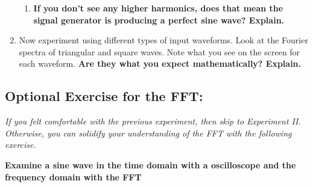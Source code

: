 \documentclass{../lab}
\begin{document}
\begin{enumerate}
\begin{enumerate}
        \item \textbf{If you don't see any higher harmonics, does that mean the signal generator is producing a perfect sine wave? Explain.}

    \end{enumerate}

    \item Now experiment using different types of input waveforms. Look at the Fourier spectra of triangular and square waves. Note what you see on the screen for each waveform. \textbf{Are they what you expect mathematically? Explain.}

\end{enumerate}

\subsection{Optional Exercise for the FFT:}

\emph{If you felt comfortable with the previous experiment, then skip to Experiment II. Otherwise, you can solidify your understanding of the FFT with the following exercise.}

\noindent\textbf{Examine a sine wave in the time domain with a oscilloscope and the frequency domain with the FFT}
\end{document}
